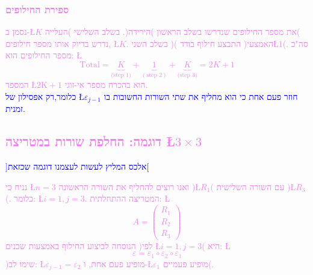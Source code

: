 \documentclass[english,hebrew]{article}
\begin{document}
\subsubsection{\textcolor{violet}{ספירת החילופים}}

\textcolor{violet}{נסמן ב-\L{$K$} את מספר החילופים שנדרשו בשלב הראשון
)הירידה(. בשלב השלישי )העלייה( נדרש בדיוק אותו מספר חילופים, \L{$K$}.
בשלב השני )האמצעי( התבצע חילוף בודד )\L{$1$}(. סה"כ מספר החילופים
הוא: \L{%
\[
\text{Total}=\underbrace{K}_{\text{(step 1)}}+\underbrace{1}_{(\text{step }2)}+\underbrace{K}_{\text{(step 3)}}=2K+1
\]
}%
המספר \L{$2\text{K}+1$} הוא בהכרח מספר אי-זוגי.}\\

\textcolor{blue}{כלומר,רק אפסילון של \L{$\varepsilon_{j-1}$} חוזר
פעם אחת כי הוא מחליף את שתי השורות החשובות בו זמנית.}

\subsection{\textcolor{violet}{דוגמה: החלפת שורות במטריצה \L{$3\times3$}}}

\textcolor{blue}{{]}אלכס המליץ לעשות לעצמנו דוגמה שכזאת{[}}

\textcolor{violet}{נניח כי \L{$n=3$} ואנו רוצים להחליף את השורה הראשונה
)\L{$R_{1}$}( עם השורה השלישית )\L{$R_{3}$}(. כלומר: \L{$i=1,j=3$}.
המטריצה ההתחלתית: \L{%
\[
A=\begin{pmatrix}R_{1}\\
R_{2}\\
R_{3}
\end{pmatrix}
\]
}%
הנוסחה לביצוע החילוף באמצעות שכנים )לפי \L{$i=1,j=3$}( היא: \L{%
\[
\varepsilon=\varepsilon_{1}\circ\varepsilon_{2}\circ\varepsilon_{1}
\]
}%
)שימו לב: \L{$\varepsilon_{j-1}=\varepsilon_{2}$} מופיע פעם אחת,
ו-\L{$\varepsilon_{1}$} מופיע פעמיים(.}
\end{document}
